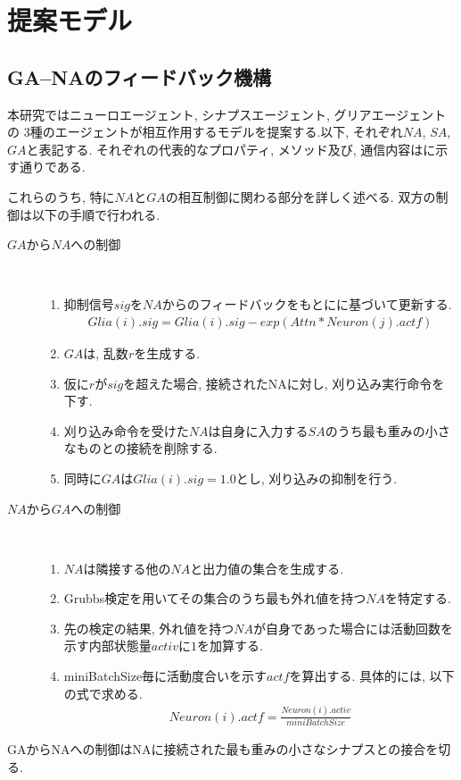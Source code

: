 \documentclass[a4paper,10.5pt,twocolumn]{jsarticle}
\begin{document}
\section{提案モデル}
\subsection{GA--NAのフィードバック機構}
本研究ではニューロエージェント, シナプスエージェント, グリアエージェントの
3種のエージェントが相互作用するモデルを提案する.以下, それぞれ$NA$, $SA$, $GA$と表記する.
それぞれの代表的なプロパティ, メソッド及び, 通信内容はに示す通りである.

これらのうち, 特に$NA$と$GA$の相互制御に関わる部分を詳しく述べる.
双方の制御は以下の手順で行われる.
\begin{description}
  \item[$GA$から$NA$への制御]\mbox{}\\
  \begin{enumerate}
    \item 抑制信号$sig$を$NA$からのフィードバックをもとにに基づいて更新する.
    \begin{align}
      Glia(i).sig=Glia(i).sig-exp(Attn*Neuron(j).actf)
      \label{eq:koushin}
    \end{align}
    \item $GA$は, 乱数$r$を生成する.
    \item 仮に$r$が$sig$を超えた場合, 接続されたNAに対し, 
    刈り込み実行命令を下す.
    \item 刈り込み命令を受けた$NA$は自身に入力する$SA$のうち最も重みの小さなものとの接続を削除する.
    \item 同時に$GA$は$Glia(i).sig=1.0$とし, 刈り込みの抑制を行う.
  \end{enumerate}
  \item[$NA$から$GA$への制御]\mbox{}\\
  \begin{enumerate}
    \item $NA$は隣接する他の$NA$と出力値の集合を生成する.
    \item Grubbs検定を用いてその集合のうち最も外れ値を持つ$NA$を特定する.
    \item 先の検定の結果, 外れ値を持つ$NA$が自身であった場合には活動回数を示す内部状態量$activ$に$1$を加算する.
    \item miniBatchSize毎に活動度合いを示す$actf$を算出する.
    具体的には, 以下の式で求める.
    \begin{align}
      Neuron(i).actf=\frac{Neuron(i).activ}{miniBatchSize}  
    \end{align}
  \end{enumerate}  
\end{description}
GAからNAへの制御はNAに接続された最も重みの小さなシナプスとの接合を切る.
\end{document}
